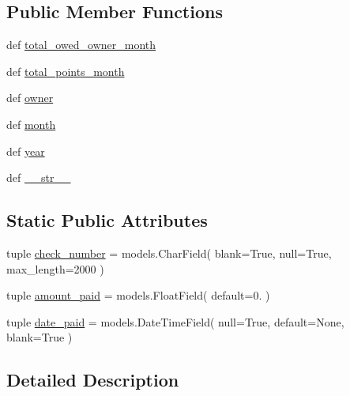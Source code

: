 \subsection*{Public Member Functions}
\begin{DoxyCompactItemize}
\item 
def \hyperlink{classmonthly__summary_1_1models_1_1MonthlyReport_a92b300df635d4ec93e26aa12c17b7ced}{total\-\_\-owed\-\_\-owner\-\_\-month}
\item 
def \hyperlink{classmonthly__summary_1_1models_1_1MonthlyReport_a7356ebbbfac0088c42ce0e86e07cff5d}{total\-\_\-points\-\_\-month}
\item 
def \hyperlink{classmonthly__summary_1_1models_1_1MonthlyReport_a55eb1279b668cacfb365e467b34f7320}{owner}
\item 
def \hyperlink{classmonthly__summary_1_1models_1_1MonthlyReport_aa654361d0392dadf061c41d608bb7bc5}{month}
\item 
def \hyperlink{classmonthly__summary_1_1models_1_1MonthlyReport_a592d408d37a11198e7b5a32fe9752cc2}{year}
\item 
def \hyperlink{classmonthly__summary_1_1models_1_1MonthlyReport_ad282cefe410007f01f81372fcdaf3071}{\-\_\-\-\_\-str\-\_\-\-\_\-}
\end{DoxyCompactItemize}
\subsection*{Static Public Attributes}
\begin{DoxyCompactItemize}
\item 
tuple \hyperlink{classmonthly__summary_1_1models_1_1MonthlyReport_a84648435431842eca777a3b801ba0863}{check\-\_\-number} = models.\-Char\-Field( blank=True, null=True, max\-\_\-length=2000 )
\item 
tuple \hyperlink{classmonthly__summary_1_1models_1_1MonthlyReport_adc095c2e11bad0e2c1dc3d3d8dad1587}{amount\-\_\-paid} = models.\-Float\-Field( default=0. )
\item 
tuple \hyperlink{classmonthly__summary_1_1models_1_1MonthlyReport_ad9dba565d3c0962eb0279bb2c01e5d3d}{date\-\_\-paid} = models.\-Date\-Time\-Field( null=True, default=None, blank=True )
\end{DoxyCompactItemize}


\subsection{Detailed Description}


